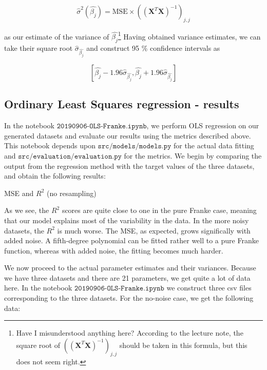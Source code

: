 \documentclass{article}
\begin{document}
$$
{\hat{\sigma}}^2 (\hat{\beta_j}) = \mathrm{MSE} \times (({\mathbf{X}}^T \mathbf{X})^{-1})_{j, j}
$$

as our estimate of the variance of $\hat{\beta_j}$\footnote{Have I misunderstood anything here? According to the lecture note, the square root of $(({\mathbf{X}}^T \mathbf{X})^{-1})_{j, j}$ should be taken in this formula, but this does not seem right.} Having obtained variance estimates, we can take their square root ${\hat{\sigma}}_{\hat{\beta_j}}$ and construct 95 \% confidence intervals as

$$
\left[ {\hat{\beta_j}} - 1.96{\hat{\sigma}}_{\hat{\beta_j}}, {\hat{\beta_j}} + 1.96{\hat{\sigma}}_{\hat{\beta_j}} \right]
$$

\subsection{Ordinary Least Squares regression - results}
In the notebook $\texttt{20190906-OLS-Franke.ipynb}$, we perform OLS regression on our generated datasets and evaluate our results using the metrics described above. This notebook depends upon $\texttt{src/models/models.py}$ for the actual data fitting and $\texttt{src/evaluation/evaluation.py}$ for the metrics. We begin by comparing the output from the regression method with the target values of the three datasets, and obtain the following results:

\begin{table}[h]
    \caption{MSE and $R^2$ (no resampling)}
\end{table}

As we see, the $R^2$ scores are quite close to one in the pure Franke case, meaning that our model explains most of the variability in the data. In the more noisy datasets, the $R^2$ is much worse. The MSE, as expected, grows significally with added noise. A fifth-degree polynomial can be fitted rather well to a pure Franke function, whereas with added noise, the fitting becomes much harder.

We now proceed to the actual parameter estimates and their variances. Because we have three datasets and there are 21 parameters, we get quite a lot of data here. In the notebook $\texttt{20190906-OLS-Franke.ipynb}$ we construct three csv files corresponding to the three datasets. For the no-noise case, we get the following data:
\end{document}

